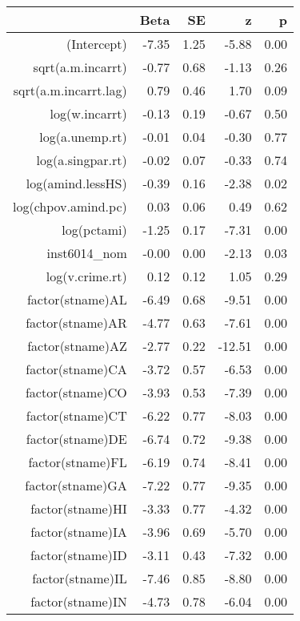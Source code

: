 \begin{table}[ht]
\centering
\begin{tabular}{rrrrr}
  \hline
 & Beta & SE & z & p \\ 
  \hline
(Intercept) & -7.35 & 1.25 & -5.88 & 0.00 \\ 
  sqrt(a.m.incarrt) & -0.77 & 0.68 & -1.13 & 0.26 \\ 
  sqrt(a.m.incarrt.lag) & 0.79 & 0.46 & 1.70 & 0.09 \\ 
  log(w.incarrt) & -0.13 & 0.19 & -0.67 & 0.50 \\ 
  log(a.unemp.rt) & -0.01 & 0.04 & -0.30 & 0.77 \\ 
  log(a.singpar.rt) & -0.02 & 0.07 & -0.33 & 0.74 \\ 
  log(amind.lessHS) & -0.39 & 0.16 & -2.38 & 0.02 \\ 
  log(chpov.amind.pc) & 0.03 & 0.06 & 0.49 & 0.62 \\ 
  log(pctami) & -1.25 & 0.17 & -7.31 & 0.00 \\ 
  inst6014\_nom & -0.00 & 0.00 & -2.13 & 0.03 \\ 
  log(v.crime.rt) & 0.12 & 0.12 & 1.05 & 0.29 \\ 
  factor(stname)AL & -6.49 & 0.68 & -9.51 & 0.00 \\ 
  factor(stname)AR & -4.77 & 0.63 & -7.61 & 0.00 \\ 
  factor(stname)AZ & -2.77 & 0.22 & -12.51 & 0.00 \\ 
  factor(stname)CA & -3.72 & 0.57 & -6.53 & 0.00 \\ 
  factor(stname)CO & -3.93 & 0.53 & -7.39 & 0.00 \\ 
  factor(stname)CT & -6.22 & 0.77 & -8.03 & 0.00 \\ 
  factor(stname)DE & -6.74 & 0.72 & -9.38 & 0.00 \\ 
  factor(stname)FL & -6.19 & 0.74 & -8.41 & 0.00 \\ 
  factor(stname)GA & -7.22 & 0.77 & -9.35 & 0.00 \\ 
  factor(stname)HI & -3.33 & 0.77 & -4.32 & 0.00 \\ 
  factor(stname)IA & -3.96 & 0.69 & -5.70 & 0.00 \\ 
  factor(stname)ID & -3.11 & 0.43 & -7.32 & 0.00 \\ 
  factor(stname)IL & -7.46 & 0.85 & -8.80 & 0.00 \\ 
  factor(stname)IN & -4.73 & 0.78 & -6.04 & 0.00 \\ 

\end{tabular}
\end{table}
